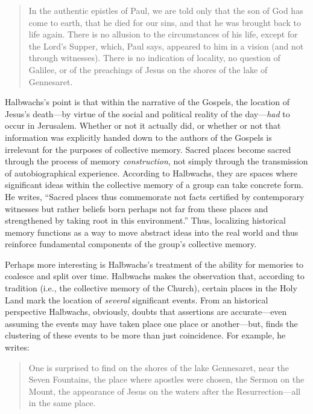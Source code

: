 \begin{quote}
In the authentic epistles of Paul, we are told only that the son of God
has come to earth, that he died for our sins, and that he was brought
back to life again. There is no allusion to the circumstances of his
life, except for the Lord's Supper, which, Paul says, appeared to him in
a vision (and not through witnesses). There is no indication of
locality, no question of Galilee, or of the preachings of Jesus on the
shores of the lake of Gennesaret.\autocite[209]{halbwachs1992}
\end{quote}

Halbwachs's point is that within the narrative of the Gospels, the
location of Jesus's death---by virtue of the social and political
reality of the day---\emph{had} to occur in
Jerusalem.\autocite[211]{halbwachs1992} Whether or not it actually did,
or whether or not that information was explicitly handed down to the
authors of the Gospels is irrelevant for the purposes of collective
memory. Sacred places become sacred through the process of memory
\emph{construction}, not simply through the transmission of
autobiographical experience. According to Halbwachs, they are spaces
where significant ideas within the collective memory of a group can take
concrete form. He writes, ``Sacred places thus commemorate not facts
certified by contemporary witnesses but rather beliefs born perhaps not
far from these places and strengthened by taking root in this
environment.''\autocite[199]{halbwachs1992} Thus, localizing historical
memory functions as a way to move abstract ideas into the real world and
thus reinforce fundamental components of the group's collective memory.

Perhaps more interesting is Halbwachs's treatment of the ability for
memories to coalesce and split over time. Halbwachs makes the
observation that, according to tradition (i.e., the collective memory of
the Church), certain places in the Holy Land mark the location of
\emph{several} significant events. From an historical perspective
Halbwachs, obviously, doubts that assertions are accurate---even
assuming the events may have taken place one place or another---but,
finds the clustering of these events to be more than just coincidence.
For example, he writes:

\begin{quote}
One is surprised to find on the shores of the lake Gennesaret, near the
Seven Fountains, the place where apostles were chosen, the Sermon on the
Mount, the appearance of Jesus on the waters after the
Resurrection---all in the same place.\autocite[220]{halbwachs1992}
\end{quote}


